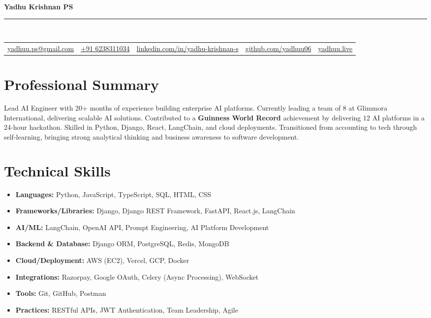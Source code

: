 \documentclass[a4paper,9.5pt]{article}
\begin{document}
\pagestyle{empty}

\begin{center}
    {\LARGE\textbf{Yadhu Krishnan PS}}\\[6pt]
    \hrule \\[6pt]
    \begin{tabular}{c c c c c}
        \href{mailto:yadhuu.ps@gmail.com}{yadhuu.ps@gmail.com} &
        \href{tel:+916238311034}{+91 6238311034} &
        \href{https://www.linkedin.com/in/yadhu-krishnan-s}{linkedin.com/in/yadhu-krishnan-s} &
        \href{https://github.com/yadhuu06}{github.com/yadhuu06} &
        \href{https://yadhuu.live}{yadhuu.live}
    \end{tabular}
\end{center}


\section*{Professional Summary}
Lead AI Engineer with 20+ months of experience building enterprise AI platforms. Currently leading a team of 8 at Glimmora International, delivering scalable AI solutions. Contributed to a \textbf{Guinness World Record} achievement by delivering 12 AI platforms in a 24-hour hackathon. Skilled in Python, Django, React, LangChain, and cloud deployments. Transitioned from accounting to tech through self-learning, bringing strong analytical thinking and business awareness to software development.

\section*{Technical Skills}
\begin{itemize}
    \item \textbf{Languages:} Python, JavaScript, TypeScript, SQL, HTML, CSS
    \item \textbf{Frameworks/Libraries:} Django, Django REST Framework, FastAPI, React.js, LangChain
    \item \textbf{AI/ML:} LangChain, OpenAI API, Prompt Engineering, AI Platform Development
    \item \textbf{Backend \& Database:} Django ORM, PostgreSQL, Redis, MongoDB
    \item \textbf{Cloud/Deployment:} AWS (EC2), Vercel, GCP, Docker
    \item \textbf{Integrations:} Razorpay, Google OAuth, Celery (Async Processing), WebSocket
    \item \textbf{Tools:} Git, GitHub, Postman
    \item \textbf{Practices:} RESTful APIs, JWT Authentication, Team Leadership, Agile
\end{itemize}
\end{document}
